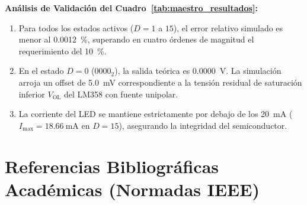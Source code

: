 \documentclass[11pt,letterpaper]{article}
\begin{document}
\noindent \textbf{Análisis de Validación del Cuadro~\ref{tab:maestro_resultados}:}
\begin{enumerate}
    \item Para todos los estados activos ($D=1$ a $15$), el error relativo simulado es menor al \SI{0.0012}{\percent}, superando en cuatro órdenes de magnitud el requerimiento del \SI{10}{\percent}.
    \item En el estado $D=0$ ($0000_2$), la salida teórica es \SI{0.0000}{\volt}. La simulación arroja un offset de \SI{5.0}{\milli\volt} correspondiente a la tensión residual de saturación inferior $V_{\text{OL}}$ del LM358 con fuente unipolar.
    \item La corriente del LED se mantiene estrictamente por debajo de los \SI{20}{\milli\ampere} ($I_{\text{max}} = \SI{18.66}{\milli\ampere}$ en $D=15$), asegurando la integridad del semiconductor.
\end{enumerate}

\section{Referencias Bibliográficas Académicas (Normadas IEEE)}
\end{document}
